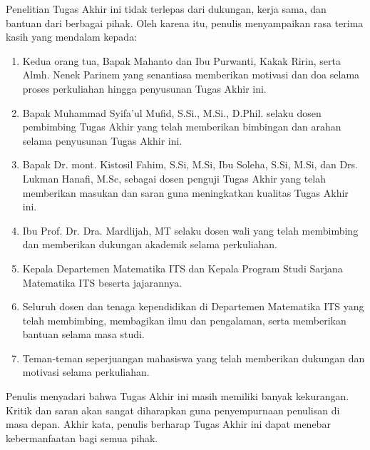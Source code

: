 Penelitian Tugas Akhir ini tidak terlepas dari dukungan, kerja sama, dan bantuan dari berbagai pihak.
Oleh karena itu, penulis menyampaikan rasa terima kasih yang mendalam kepada:

\begin{enumerate}
  \item Kedua orang tua, Bapak Mahanto dan Ibu Purwanti, Kakak Ririn, serta Almh. Nenek Parinem yang senantiasa memberikan motivasi dan doa selama proses perkuliahan hingga penyusunan Tugas Akhir ini.
  \item Bapak Muhammad Syifa'ul Mufid, S.Si., M.Si., D.Phil. selaku dosen pembimbing Tugas Akhir yang telah memberikan bimbingan dan arahan selama penyusunan Tugas Akhir ini.
  \item Bapak Dr. mont. Kistosil Fahim, S.Si, M.Si, Ibu Soleha, S.Si, M.Si, dan Drs. Lukman Hanafi, M.Sc, sebagai dosen penguji Tugas Akhir yang telah memberikan masukan dan saran guna meningkatkan kualitas Tugas Akhir ini.
  \item Ibu Prof. Dr. Dra. Mardlijah, MT selaku dosen wali yang telah membimbing dan memberikan dukungan akademik selama perkuliahan.
  \item Kepala Departemen Matematika ITS dan Kepala Program Studi Sarjana Matematika ITS beserta jajarannya.
  \item Seluruh dosen dan tenaga kependidikan di Departemen Matematika ITS yang telah membimbing, membagikan ilmu dan pengalaman, serta memberikan bantuan selama masa studi.
  \item Teman-teman seperjuangan mahasiswa yang telah memberikan dukungan dan motivasi selama perkuliahan.
\end{enumerate}

Penulis menyadari bahwa Tugas Akhir ini masih memiliki banyak kekurangan.
Kritik dan saran akan sangat diharapkan guna penyempurnaan penulisan di masa depan.
Akhir kata, penulis berharap Tugas Akhir ini dapat menebar kebermanfaatan bagi semua pihak.
